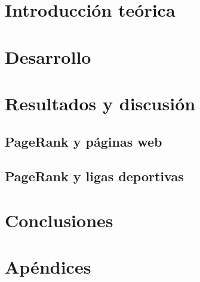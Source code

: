 \documentclass[hidelinks,a4paper,12pt, nofootinbib]{article}
\begin{document}
\maketitle

\tableofcontents
\newpage

\section{Introducción teórica}

\newpage

\section{Desarrollo}

\newpage

\section{Resultados y discusión}
\subsection{PageRank y páginas web}

\newpage
\subsection{PageRank y ligas deportivas}
%
\newpage

\section{Conclusiones}

\newpage

\section{Apéndices}

\end{document}

